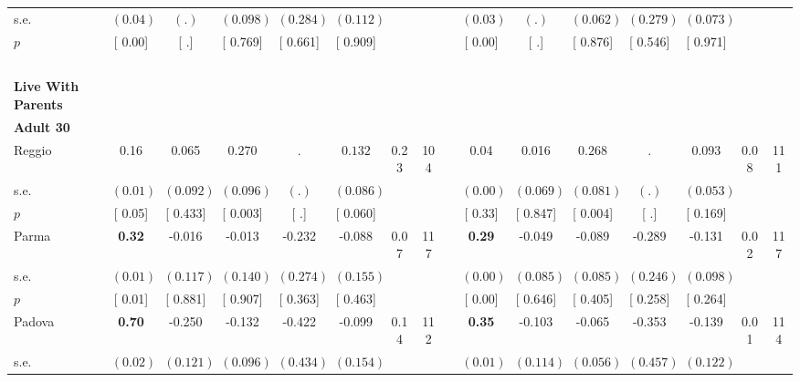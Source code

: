 \begin{longtable}{L{8em} c c c c c c c p{1em} c c c c c c c}
\quad \quad \quad \quad s.e.& $ (     0.04)$ & $ (        .)$ & $ (    0.098)$ & $ (    0.284)$ & $ (    0.112)$ & & & & $ (     0.03)$ & $ (        .)$ & $ (    0.062)$ & $ (    0.279)$ & $ (    0.073)$ & &  \\*
\quad \quad \quad \quad $ p$ & [     0.00] & [        .] & [    0.769] & [    0.661] & [    0.909] & & & & [     0.00] & [        .] & [    0.876] & [    0.546] & [    0.971] & &  \\[1em]
~\\[1em]
\textbf{Live With Parents} \\*
\quad \quad \textbf{Adult 30} & & & & & & & & & & & & & & & \\* 
\quad \quad \quad Reggio& 0.16 &     0.065 & $ \mathbf{    0.270}$ &         . & $ \mathbf{    0.132}$ &      0.23 &       104 & & 0.04 &     0.016 & $ \mathbf{    0.268}$ &         . &     0.093 &      0.08 &       111  \\*
\quad \quad \quad \quad s.e.& $ (     0.01)$ & $ (    0.092)$ & $ (    0.096)$ & $ (        .)$ & $ (    0.086)$ & & & & $ (     0.00)$ & $ (    0.069)$ & $ (    0.081)$ & $ (        .)$ & $ (    0.053)$ & &  \\*
\quad \quad \quad \quad $ p$ & [     0.05] & [    0.433] & [    0.003] & [        .] & [    0.060] & & & & [     0.33] & [    0.847] & [    0.004] & [        .] & [    0.169] & &  \\[1em]
\quad \quad \quad Parma& \textbf{     0.32} &    -0.016 &    -0.013 &    -0.232 &    -0.088 &      0.07 &       117 & & \textbf{     0.29} &    -0.049 &    -0.089 &    -0.289 &    -0.131 &      0.02 &       117  \\*
\quad \quad \quad \quad s.e.& $ (     0.01)$ & $ (    0.117)$ & $ (    0.140)$ & $ (    0.274)$ & $ (    0.155)$ & & & & $ (     0.00)$ & $ (    0.085)$ & $ (    0.085)$ & $ (    0.246)$ & $ (    0.098)$ & &  \\*
\quad \quad \quad \quad $ p$ & [     0.01] & [    0.881] & [    0.907] & [    0.363] & [    0.463] & & & & [     0.00] & [    0.646] & [    0.405] & [    0.258] & [    0.264] & &  \\[1em]
\quad \quad \quad Padova& \textbf{     0.70} &    -0.250 &    -0.132 &    -0.422 &    -0.099 &      0.14 &       112 & & \textbf{     0.35} &    -0.103 &    -0.065 &    -0.353 &    -0.139 &      0.01 &       114  \\*
\quad \quad \quad \quad s.e.& $ (     0.02)$ & $ (    0.121)$ & $ (    0.096)$ & $ (    0.434)$ & $ (    0.154)$ & & & & $ (     0.01)$ & $ (    0.114)$ & $ (    0.056)$ & $ (    0.457)$ & $ (    0.122)$ & &  \\*

\end{longtable}
